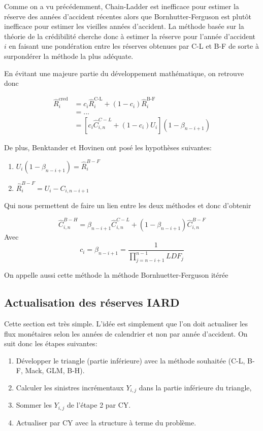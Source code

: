 Comme on a vu précédemment, Chain-Ladder est inefficace pour estimer la réserve des années d'accident récentes alors que Bornhutter-Ferguson est plutôt inefficace pour estimer les vieilles années d'accident. La méthode basée sur la théorie de la crédibilité cherche donc à estimer la réserve pour l'année d'accident $i$ en faisant une pondération entre les réserves obtenues par C-L et B-F de sorte à surpondérer la méthode la plus adéquate.

En évitant une majeure partie du développement mathématique, on retrouve donc

$$\boxed{\begin{aligned}
\widehat{R}_i^{\text{cred}} &= c_i \widehat{R}_i^{\text{C-L}} + (1-c_i) \widehat{R}_i^{\text{B-F}} \\
 &= ... \\
 &= \left[c_i \widehat{C}_{i,n}^{C-L} + (1-c_i) U_i \right](1 - \beta_{n-i+1})
\end{aligned}}$$

De plus, Benktander et Hovinen ont posé les hypothèses suivantes:
\begin{enumerate}
\item $U_i(1-\beta_{n-i+1}) = \widehat{R}_i^{B-F}$
\item $\widehat{R}_i^{B-F} = U_i - C_{i,n-i+1}$
\end{enumerate}

Qui nous permettent de faire un lien entre les deux méthodes et donc d'obtenir

$$\boxed{\widehat{C}_{i,n}^{B-H}=\beta_{n-i+1} \widehat{C}_{i,n}^{C-L} + (1-\beta_{n-i+1}) \widehat{C}_{i,n}^{B-F}}$$
Avec
$$\boxed{c_i = \beta_{n-i+1}= \frac{1}{\prod_{j=n-i+1}^{n-1} LDF_j}}$$

On appelle aussi cette méthode la méthode Bornhuetter-Ferguson itérée

\subsection*{Actualisation des réserves IARD}

Cette section est très simple. L'idée est simplement que l'on doit actualiser les flux monétaires selon les années de calendrier et non par année d'accident. On suit donc les étapes suivantes:

\begin{enumerate}
\item Développer le triangle (partie inférieure) avec la méthode souhaitée (C-L, B-F, Mack, GLM, B-H).
\item Calculer les sinistres incrémentaux $Y_{i,j}$ dans la partie inférieure du triangle,
\item Sommer les $Y_{i,j}$ de l'étape 2 par CY.
\item Actualiser par CY avec la structure à terme du problème.
\end{enumerate}

